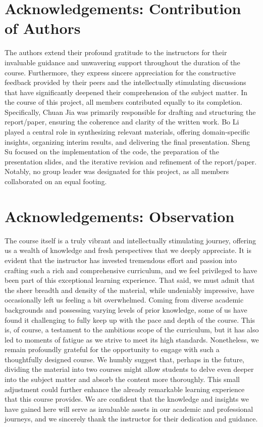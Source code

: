 \documentclass[12pt]{article}
\begin{document}
\section*{Acknowledgements: Contribution of Authors}
The authors extend their profound gratitude to the instructors for their invaluable guidance and unwavering support throughout the duration of the course. Furthermore, they express sincere appreciation for the constructive feedback provided by their peers and the intellectually stimulating discussions that have significantly deepened their comprehension of the subject matter. In the course of this project, all members contributed equally to its completion. Specifically, Chuan Jia was primarily responsible for drafting and structuring the report/paper, ensuring the coherence and clarity of the written work. Bo Li played a central role in synthesizing relevant materials, offering domain-specific insights, organizing interim results, and delivering the final presentation. Sheng Su focused on the implementation of the code, the preparation of the presentation slides, and the iterative revision and refinement of the report/paper. Notably, no group leader was designated for this project, as all members collaborated on an equal footing.

\section*{Acknowledgements: Observation}
The course itself is a truly vibrant and intellectually stimulating journey, offering us a wealth of knowledge and fresh perspectives that we deeply appreciate. It is evident that the instructor has invested tremendous effort and passion into crafting such a rich and comprehensive curriculum, and we feel privileged to have been part of this exceptional learning experience. That said, we must admit that the sheer breadth and density of the material, while undeniably impressive, have occasionally left us feeling a bit overwhelmed. Coming from diverse academic backgrounds and possessing varying levels of prior knowledge, some of us have found it challenging to fully keep up with the pace and depth of the course. This is, of course, a testament to the ambitious scope of the curriculum, but it has also led to moments of fatigue as we strive to meet its high standards. Nonetheless, we remain profoundly grateful for the opportunity to engage with such a thoughtfully designed course. We humbly suggest that, perhaps in the future, dividing the material into two courses might allow students to delve even deeper into the subject matter and absorb the content more thoroughly. This small adjustment could further enhance the already remarkable learning experience that this course provides. We are confident that the knowledge and insights we have gained here will serve as invaluable assets in our academic and professional journeys, and we sincerely thank the instructor for their dedication and guidance.
\end{document}
